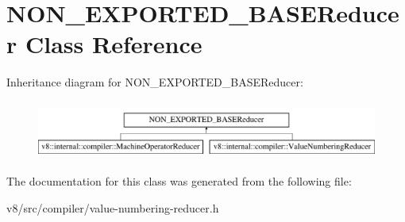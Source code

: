 \hypertarget{classNON__EXPORTED__BASEReducer}{}\section{N\+O\+N\+\_\+\+E\+X\+P\+O\+R\+T\+E\+D\+\_\+\+B\+A\+S\+E\+Reducer Class Reference}
\label{classNON__EXPORTED__BASEReducer}
Inheritance diagram for N\+O\+N\+\_\+\+E\+X\+P\+O\+R\+T\+E\+D\+\_\+\+B\+A\+S\+E\+Reducer\+:\begin{figure}[H]
\begin{center}
\leavevmode
\includegraphics[height=1.931034cm]{classNON__EXPORTED__BASEReducer}
\end{center}
\end{figure}


The documentation for this class was generated from the following file\+:\begin{DoxyCompactItemize}
\item 
v8/src/compiler/value-\/numbering-\/reducer.\+h\end{DoxyCompactItemize}
